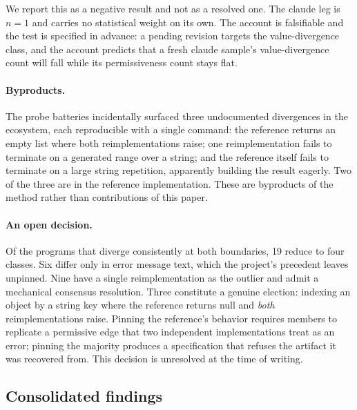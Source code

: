 \documentclass[10pt,twocolumn]{article}
\begin{document}
We report this as a negative result and not as a resolved one. The claude
leg is $n = 1$ and carries no statistical weight on its own. The account
is falsifiable and the test is specified in advance: a pending revision
targets the value-divergence class, and the account predicts that a fresh
claude sample's value-divergence count will fall while its permissiveness
count stays flat.

\paragraph{Byproducts.} The probe batteries incidentally surfaced three
undocumented divergences in the ecosystem, each reproducible with a
single command: the reference returns an empty list where both
reimplementations raise; one reimplementation fails to terminate on a
generated range over a string; and the reference itself fails to
terminate on a large string repetition, apparently building the result
eagerly. Two of the three are in the reference implementation. These are
byproducts of the method rather than contributions of this paper.

\paragraph{An open decision.} Of the programs that diverge consistently
at both boundaries, 19 reduce to four classes. Six differ only in error
message text, which the project's precedent leaves unpinned. Nine have a
single reimplementation as the outlier and admit a mechanical consensus
resolution. Three constitute a genuine election: indexing an object by a
string key where the reference returns null and \emph{both}
reimplementations raise. Pinning the reference's behavior requires
members to replicate a permissive edge that two independent
implementations treat as an error; pinning the majority produces a
specification that refuses the artifact it was recovered from. This
decision is unresolved at the time of writing.

\subsection{Consolidated findings}
\label{sec:consolidated}
\end{document}
